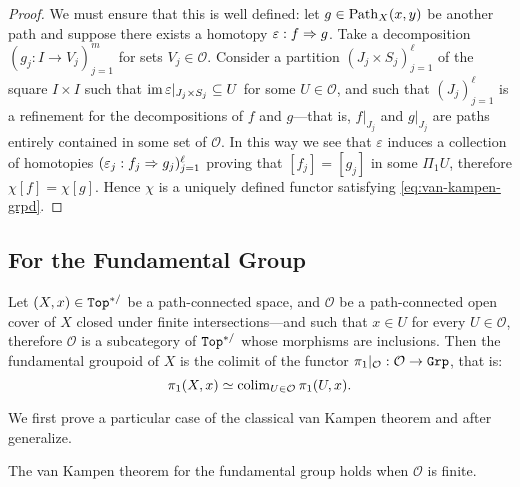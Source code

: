 \begin{proof}
    We must ensure that this is well defined: let \(g \in \operatorname{Path}_X(x, y)\) be another
    path and suppose there exists a homotopy \(\varepsilon: f \Rightarrow g\). Take a
    decomposition \((g_j: I \to V_j)_{j=1}^m\) for sets \(V_j \in
    \mathcal{O}\). Consider a partition \((J_j \times S_j)_{j=1}^{\ell}\) of the
    square \(I \times I\) such that
    \(\operatorname{im} \varepsilon|_{J_j \times S_j} \subseteq U\) for some
    \(U \in \mathcal{O}\), and such that \((J_j)_{j=1}^{\ell}\) is a refinement for
    the decompositions of \(f\) and \(g\)---that is, \(f|_{J_j}\) and \(g|_{J_j}\)
    are paths entirely contained in some set of \(\mathcal{O}\). In this way we see
    that \(\varepsilon\) induces a collection of homotopies
    \((\varepsilon_j: f_j \Rightarrow g_j)_{j=1}^{\ell}\) proving that \([f_j] = [g_j]\) in
    some \(\Pi_1 U\), therefore \(\chi [f] = \chi [g]\). Hence \(\chi\) is a
    uniquely defined functor satisfying \cref{eq:van-kampen-grpd}.
\end{proof}

\subsection{For the Fundamental Group}

\begin{theorem}
    \label{thm:van-kampen-group}
    Let \((X, x) \in {\texttt{Top}^{*/}}\) be a path-connected space, and \(\mathcal{O}\) be a
    path-connected open cover of \(X\) closed under finite intersections---and such
    that \(x \in U\) for every \(U \in \mathcal{O}\), therefore \(\mathcal{O}\) is a
    subcategory of \({\texttt{Top}^{*/}}\) whose morphisms are inclusions. Then the fundamental
    groupoid of \(X\) is the colimit of the functor \(\pi_1|_{\mathcal{O}}:
    \mathcal{O} \to {\texttt{Grp}}\), that is:
    \[
        \pi_1(X, x) \simeq \operatorname{colim}_{U \in \mathcal{O}} \pi_1(U, x).
    \]
\end{theorem}

We first prove a particular case of the classical van Kampen theorem and after
generalize.

\begin{lemma}
    \label{lem:van-kampen-finite-cover}
    The van Kampen theorem for the fundamental group holds when \(\mathcal{O}\) is
    finite.
\end{lemma}

